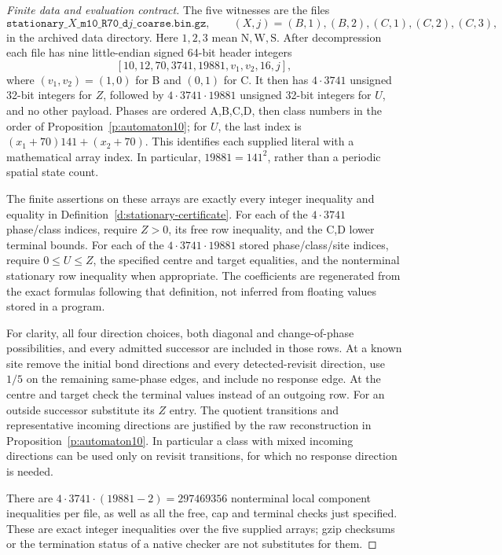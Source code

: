 \begin{proof}[Finite data and evaluation contract]
The five witnesses are the files
\[
 \texttt{stationary\_}\!X\texttt{\_m10\_R70\_d}j
                  \texttt{\_coarse.bin.gz},
 \qquad (X,j)=(B,1),(B,2),(C,1),(C,2),(C,3),
\]
in the archived data directory. Here \(1,2,3\) mean
\(\mathrm N,\mathrm W,\mathrm S\). After decompression each file
has nine little-endian signed 64-bit header integers
\[
 [10,12,70,3741,19881,v_1,v_2,16,j],
\]
where \((v_1,v_2)=(1,0)\) for B and \((0,1)\) for C.
It then has \(4\cdot3741\) unsigned 32-bit integers for \(Z\),
followed by \(4\cdot3741\cdot19881\) unsigned 32-bit integers
for \(U\), and no other payload. Phases are ordered A,B,C,D,
then class numbers in the order of
Proposition~\ref{p:automaton10}; for \(U\), the last index is
\((x_1+70)141+(x_2+70)\). This identifies each supplied literal
with a mathematical array index. In particular,
\(19881=141^2\), rather than a periodic spatial state count.

The finite assertions on these arrays are exactly every integer
inequality and equality in Definition~\ref{d:stationary-certificate}.
For each of the \(4\cdot3741\) phase/class indices, require
\(Z>0\), its free row inequality, and the C,D lower terminal
bounds. For each of the \(4\cdot3741\cdot19881\) stored
phase/class/site indices, require \(0\le U\le Z\), the specified
centre and target equalities, and the nonterminal stationary row
inequality when appropriate. The coefficients are regenerated
from the exact formulas following that definition, not inferred
from floating values stored in a program.

For clarity, all four direction choices, both diagonal and
change-of-phase possibilities, and every admitted successor are
included in those rows. At a known site remove the initial bond
directions and every detected-revisit direction, use \(1/5\) on
the remaining same-phase edges, and include no response edge.
At the centre and target check the terminal values instead of an
outgoing row. For an outside successor substitute its \(Z\) entry.
The quotient transitions and representative incoming directions
are justified by the raw reconstruction in
Proposition~\ref{p:automaton10}. In particular a class with mixed
incoming directions can be used only on revisit transitions, for
which no response direction is needed.

There are \(4\cdot3741\cdot(19881-2)=297469356\) nonterminal
local component inequalities per file, as well as all the free,
cap and terminal checks just specified. These are exact integer
inequalities over the five supplied arrays; gzip checksums or the
termination status of a native checker are not substitutes for them.


\end{proof}
